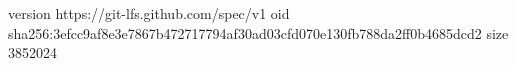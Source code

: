 version https://git-lfs.github.com/spec/v1
oid sha256:3efcc9af8e3e7867b472717794af30ad03cfd070e130fb788da2ff0b4685dcd2
size 3852024
